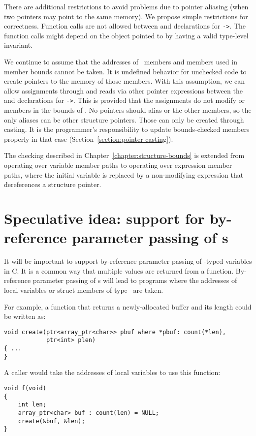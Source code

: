 There are additional restrictions to avoid problems due to pointer aliasing 
(when two pointers may point to the same memory).   We propose simple restrictions
for correctness.
Function calls are not allowed between  and 
 declarations for \texttt{->}.  The function calls 
might depend on the object pointed to by  having a  valid type-level invariant.
  
We continue to assume that the addresses of \arrayptr\ members and members
used in member bounds cannot be taken.  It is undefined behavior for unchecked
code to create pointers to the memory of those members.   With this assumption, we 
can allow assignments through and reads via other pointer expressions
between the  and  declarations for
\texttt{->}.  This is provided that the assignments do not modify 
 or members in the bounds of .  No pointers should alias
 or the other members, so the only aliases can be other structure
pointers.  Those can only be created through casting.  It is the programmer's responsibility
to update bounds-checked members properly in that case (Section~\ref{section:pointer-casting}).

The checking described in Chapter~\ref{chapter:structure-bounds} is extended from
operating over variable member paths to operating over expression member paths, where
the initial variable is replaced by a non-modifying expression that dereferences a structure
pointer.

\section{Speculative idea: support for by-reference parameter passing of \protect\arrayptr s}

It will be important to support by-reference parameter passing of \arrayptr-typed variables
in C.  It is a common way that multiple values are returned from a function.  By-reference parameter
passing of \arrayptr s will lead to programs where the addresses of local variables or struct
members of type \arrayptr\ are taken.

For example, a function that returns a newly-allocated buffer and its length could be written as:
\begin{lstlisting}
void create(ptr<array_ptr<char>> pbuf where *pbuf: count(*len),
            ptr<int> plen)
{ ...
}
\end{lstlisting}
A caller would take the addresses of local variables to use this function:
\begin{lstlisting}
void f(void)
{
    int len;
    array_ptr<char> buf : count(len) = NULL;
    create(&buf, &len);
}
\end{lstlisting}

